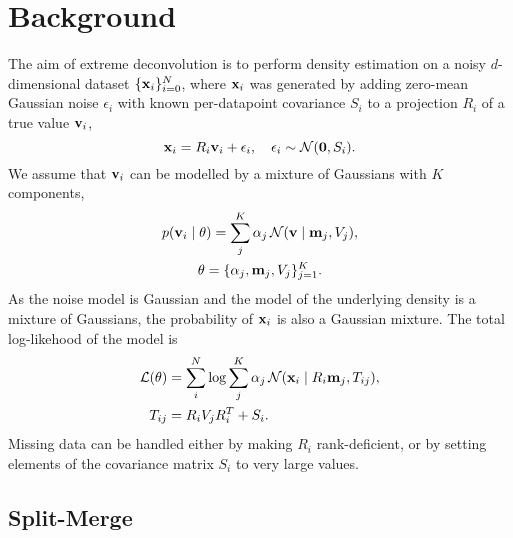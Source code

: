 \section{Background}

The aim of extreme deconvolution is to perform density estimation on a noisy $d$-dimensional dataset $\{\mathbf{x}_i\}_{i=0}^N$, where $\mathbf{x}_i$ was generated by adding zero-mean Gaussian noise $\epsilon_i$ with known per-datapoint covariance $S_i$ to a projection $R_i$ of a true value $\mathbf{v}_i$,
\begin{equation}
  \mathbf{x}_i = R_i\mathbf{v}_i + \epsilon_i,\quad  \epsilon_i \sim \mathcal{N}(\mathbf{0}, S_i).
\end{equation}
We assume that $\mathbf{v}_i$ can be modelled by a mixture of Gaussians with $K$ components,
\begin{multline}
p(\mathbf{v}_i \mid \theta) = \sum_j^K \alpha_j \,\mathcal{N}(\mathbf{v} \mid \mathbf{m}_j, V_j), \\ \theta = \{\alpha_j, \mathbf{m}_j, V_j\}_{j=1} ^ K.
\end{multline}
As the noise model is Gaussian and the model of the underlying density is a mixture of Gaussians, the probability of $\mathbf{x}_i$ is also a Gaussian mixture.
The total log-likehood of the model is
\begin{align}
\mathcal{L}(\theta) &= \sum_i^N \log \sum_j^K \alpha_j\,\mathcal{N}(\mathbf{x}_i \mid R_i\mathbf{m}_j, T_{ij}), \\
T_{ij} &= R_iV_jR_i^T + S_i.
\end{align}
Missing data can be handled either by making $R_i$ rank-deficient, or by setting elements of the covariance matrix $S_i$ to very large values.

\subsection{Split-Merge}

